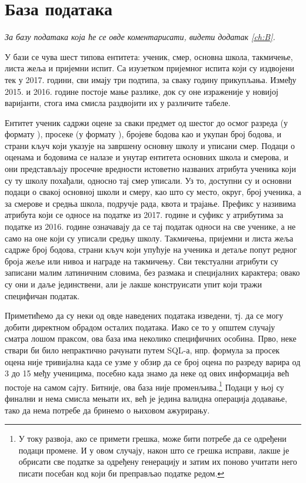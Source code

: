 \section{База података}
\vspace*{-7mm}
\emph{За базу података која ће се овде коментарисати, видети додатак \ref{ch:B}.} %

У бази се чува шест типова ентитета: ученик, смер, основна школа, такмичење, листа жеља и пријемни испит. Са изузетком пријемног испита који су издвојени тек у 2017. години, сви имају три подтипа, за сваку годину прикупљања. Између 2015. и 2016. године постоје мање разлике, док су оне израженије у новијој варијанти, стога има смисла раздвојити их у различите табеле. 

Ентитет ученик садржи оцене за сваки предмет од шестог до осмог разреда (у формату ), просеке (у формату ), бројеве бодова као и укупан број бодова, и страни кључ који указује на завршену основну школу и уписани смер. Подаци о оценама и бодовима се налазе и унутар ентитета основних школа и смерова, и они представљају просечне вредности истоветно названих атрибута ученика који су ту школу похађали, односно тај смер уписали. Уз то, доступни су и основни подаци о свакој основној школи и смеру, као што су место, округ, број ученика, а за смерове и средња школа, подручје рада, квота и трајање. Префикс  у називима атрибута који се односе на податке из 2017. године и суфикс  у атрибутима за податке из 2016. године означавају да се тај податак односи на све ученике, а не само на оне који су уписали средњу школу. Такмичења, пријемни и листа жеља садрже број бодова, страни кључ који упућује на ученика и детаље попут редног броја жеље или нивоа и награде на такмичењу. Сви текстуални атрибути су записани малим латиничним словима, без размака и специјалних карактера; овако су они и даље јединствени, али је лакше конструисати упит који тражи специфичан податак.

Приметићемо да су неки од овде наведених података изведени, тј. да се могу добити директном обрадом осталих података. Иако се то у општем случају сматра лошом праксом, ова база има неколико специфичних особина. Прво, неке ствари би било непрактично рачунати путем SQL-а, нпр. формула за просек оцена није тривијална када се узме у обзир да се број оцена по разреду варира од 3 до 15 међу ученицима, посебно када знамо да неке од ових информација већ постоје на самом сајту. Битније, ова база није променљива.\footnote{У току развоја, ако се примети грешка, може бити потребе да се одређени подаци промене. И у овом случају, након што се грешка исправи, лакше је обрисати све податке за одређену генерацију и затим их поново учитати него писати посебан код који би преправљао податке редом.} Подаци у њој су финални и нема смисла мењати их, већ је једина валидна операција додавање, тако да нема потребе да бринемо о њиховом ажурирању.



